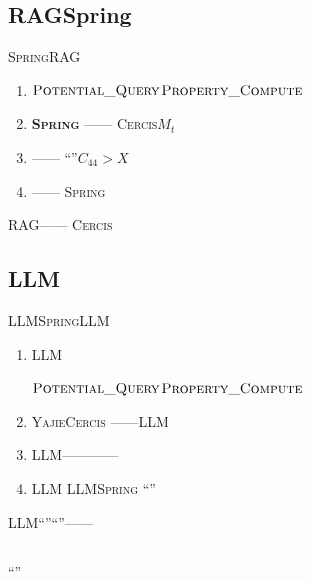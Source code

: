 \documentclass[12pt,a4paper]{article}
\theoremstyle{remark}
\newcommand{\Spring}{\textsc{Spring}}
\newcommand{\Yajie}{\textsc{Yajie}}
\newcommand{\Cercis}{\textsc{Cercis}}
\begin{document}
\subsection{RAGSpring}

\Spring{}RAG\textbf{}


\begin{enumerate}[label=(\alph*),itemsep=2pt]
    \item \textbf{} $\textsc{Potential\_Query}$$\textsc{Property\_Compute}$
    
    \item \textbf{\Spring{}} ——
    \Cercis{}$M_t$
    \item \textbf{} ——
    “”$C_{44} > X$
    \item \textbf{} ——
    \Spring{}
\end{enumerate}

RAG\textbf{}——
\Cercis{}


\subsection{LLM}

LLM\Spring{}LLM

\begin{enumerate}[label=\textbf{ \arabic*},leftmargin=*,itemsep=3pt]
    \item \textbf{} LLM
    
    $\textsc{Potential\_Query}$$\textsc{Property\_Compute}$
    
    \item \textbf{} \Yajie{}\Cercis{}
    ——LLM
    
    \item \textbf{} LLM————
    
    
    
    \item \textbf{} LLM
    LLM\Spring{}\textit{}
    “”
\end{enumerate}

LLM“”“”——
\textbf{}

\subsection{}

“”
\end{document}
